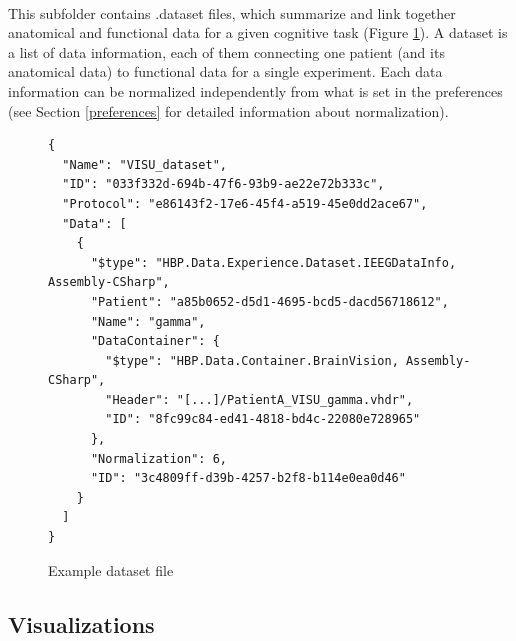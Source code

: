 \documentclass[a4paper]{article}
\begin{document}
\paragraph{} This subfolder contains .dataset files, which summarize and link together anatomical and functional data for a given cognitive task (Figure \ref{datasetFile}).
A dataset is a list of data information, each of them connecting one patient (and its anatomical data) to functional data for a single experiment. Each data information can be normalized independently from what is set in the preferences (see Section \ref{preferences} for detailed information about normalization).
\begin{figure}[H]
\begin{lstlisting}
{
  "Name": "VISU_dataset",
  "ID": "033f332d-694b-47f6-93b9-ae22e72b333c",
  "Protocol": "e86143f2-17e6-45f4-a519-45e0dd2ace67",
  "Data": [
    {
      "$type": "HBP.Data.Experience.Dataset.IEEGDataInfo, Assembly-CSharp",
      "Patient": "a85b0652-d5d1-4695-bcd5-dacd56718612",
      "Name": "gamma",
      "DataContainer": {
        "$type": "HBP.Data.Container.BrainVision, Assembly-CSharp",
        "Header": "[...]/PatientA_VISU_gamma.vhdr",
        "ID": "8fc99c84-ed41-4818-bd4c-22080e728965"
      },
      "Normalization": 6,
      "ID": "3c4809ff-d39b-4257-b2f8-b114e0ea0d46"
    }
  ]
}
\end{lstlisting}
\caption{\label{datasetFile}Example dataset file}
\end{figure}
\subsection{Visualizations}
\end{document}
